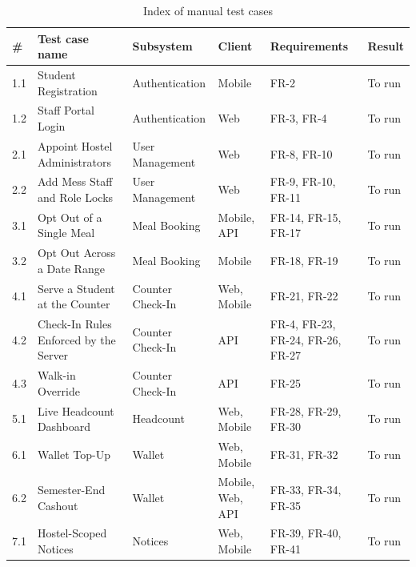 \documentclass[11pt,a4paper]{article}
\begin{document}
\begin{table}[H]
\centering
\caption{Index of manual test cases}
\label{tab:tcindex}
\small
\begin{tabular}{@{}L{0.7cm}L{4.4cm}L{2.5cm}L{1.9cm}L{3.0cm}L{1.1cm}@{}}
\toprule
\textbf{\#} & \textbf{Test case name} & \textbf{Subsystem} & \textbf{Client} & \textbf{Requirements} & \textbf{Result}\\
 & Student Registration & Authentication & Mobile & FR-2 & To run\\
1.2 & Staff Portal Login & Authentication & Web & FR-3, FR-4 & To run\\
2.1 & Appoint Hostel Administrators & User Management & Web & FR-8, FR-10 & To run\\
2.2 & Add Mess Staff and Role Locks & User Management & Web & FR-9, FR-10, FR-11 & To run\\
3.1 & Opt Out of a Single Meal & Meal Booking & Mobile, API & FR-14, FR-15, FR-17 & To run\\
3.2 & Opt Out Across a Date Range & Meal Booking & Mobile & FR-18, FR-19 & To run\\
4.1 & Serve a Student at the Counter & Counter Check-In & Web, Mobile & FR-21, FR-22 & To run\\
4.2 & Check-In Rules Enforced by the Server & Counter Check-In & API & FR-4, FR-23, FR-24, FR-26, FR-27 & To run\\
4.3 & Walk-in Override & Counter Check-In & API & FR-25 & To run\\
5.1 & Live Headcount Dashboard & Headcount & Web, Mobile & FR-28, FR-29, FR-30 & To run\\
6.1 & Wallet Top-Up & Wallet & Web, Mobile & FR-31, FR-32 & To run\\
6.2 & Semester-End Cashout & Wallet & Mobile, Web, API & FR-33, FR-34, FR-35 & To run\\
7.1 & Hostel-Scoped Notices & Notices & Web, Mobile & FR-39, FR-40, FR-41 & To run\\
\bottomrule
\end{tabular}
\end{table}
\end{document}
